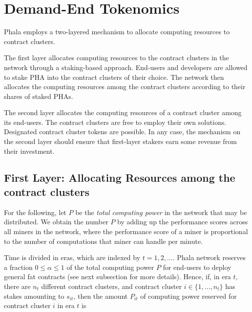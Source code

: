 \documentclass[11pt, a4paper, twocolumn]{article}
\begin{document}
\section{Demand-End Tokenomics}\label{sec:deman}
Phala employs a two-layered mechanism to allocate computing resources to contract clusters. 

The first layer allocates computing resources to the contract clusters in the network through a staking-based approach. End-users and developers are allowed to stake PHA into the contract clusters of their choice. The network then allocates the computing resources among the contract clusters according to their shares of staked PHAs.%

The second layer allocates the computing resources of a contract cluster among its end-users. The contract clusters are free to employ their own solutions. Designated contract cluster tokens are possible. In any case, the mechanism on the second layer should ensure that first-layer stakers earn some revenue from their investment.


\subsection{First Layer: Allocating Resources among the contract clusters} 
%
For the following, let $P$ be the \textit{total computing power} in the network that may be distributed. We obtain the number $P$ by adding up the performance scores across all miners in the network, where the performance score of a miner is proportional to the number of computations that miner can handle per minute. 


Time is divided in eras, which are indexed by $t = 1,2,...$. Phala network reserves a fraction $0 \leq \alpha \leq 1$ of the total computing power $P$ for end-users to deploy general fat contracts (see next subsection for more details). Hence, if, in era $t$, there are $n_t$ different contract clusters, and contract cluster $i \in \{1,...,n_t\}$ has stakes amounting to $s_{it}$, then the amount $P_{it}$ of computing power reserved for contract cluster $i$ in era $t$ is%
\end{document}
